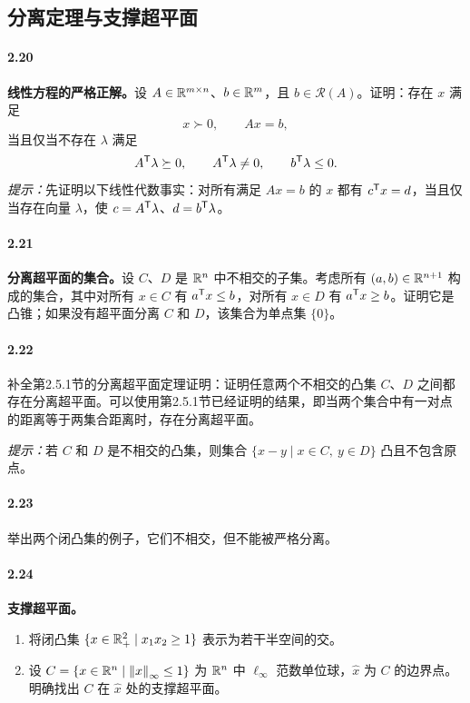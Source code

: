 \subsection*{分离定理与支撑超平面}
\paragraph{2.20}
\textbf{线性方程的严格正解。}设 $A\in\mathbb R^{m\times n}$、$b\in\mathbb R^m$，且 $b\in\mathcal R(A)$。证明：存在 $x$ 满足
\[
 x\succ0,\qquad Ax=b,
\]
当且仅当不存在 $\lambda$ 满足
\[
 A^{\mathsf T}\lambda\succeq0,\qquad A^{\mathsf T}\lambda\ne0,\qquad b^{\mathsf T}\lambda\le0.
\]
\emph{提示：}先证明以下线性代数事实：对所有满足 $Ax=b$ 的 $x$ 都有 $c^{\mathsf T}x=d$，当且仅当存在向量 $\lambda$，使 $c=A^{\mathsf T}\lambda$、$d=b^{\mathsf T}\lambda$。

\paragraph{2.21}
\textbf{分离超平面的集合。}设 $C$、$D$ 是 $\mathbb R^n$ 中不相交的子集。考虑所有 $(a,b)\in\mathbb R^{n+1}$ 构成的集合，其中对所有 $x\in C$ 有 $a^{\mathsf T}x\le b$，对所有 $x\in D$ 有 $a^{\mathsf T}x\ge b$。证明它是凸锥；如果没有超平面分离 $C$ 和 $D$，该集合为单点集 $\{0\}$。

\paragraph{2.22}
补全第2.5.1节的分离超平面定理证明：证明任意两个不相交的凸集 $C$、$D$ 之间都存在分离超平面。可以使用第2.5.1节已经证明的结果，即当两个集合中有一对点的距离等于两集合距离时，存在分离超平面。

\emph{提示：}若 $C$ 和 $D$ 是不相交的凸集，则集合 $\{x-y\mid x\in C,\ y\in D\}$ 凸且不包含原点。

\paragraph{2.23}
举出两个闭凸集的例子，它们不相交，但不能被严格分离。

\paragraph{2.24}
\textbf{支撑超平面。}
\begin{enumerate}[label=(\alph*)]
\item 将闭凸集 $\{x\in\mathbb R_+^2\mid x_1x_2\ge1\}$ 表示为若干半空间的交。
\item 设 $C=\{x\in\mathbb R^n\mid\left\lVert x\right\rVert_\infty\le1\}$ 为 $\mathbb R^n$ 中 $\ell_\infty$ 范数单位球，$\widehat x$ 为 $C$ 的边界点。明确找出 $C$ 在 $\widehat x$ 处的支撑超平面。
\end{enumerate}

